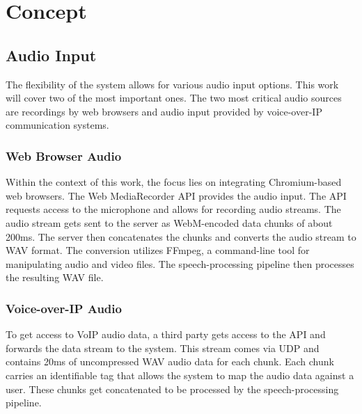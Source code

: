 \chapter{Concept}

\label{Chapter2}


\section{Audio Input}

The flexibility of the system allows for various audio input options. This work will cover two of the most important 
ones. The two most critical audio sources are recordings by web browsers and audio input provided by voice-over-IP 
communication systems.

\subsection{Web Browser Audio}

Within the context of this work, the focus lies on integrating Chromium-based web browsers. The Web MediaRecorder API 
provides the audio input. The API requests access to the microphone and allows for recording audio streams. 
The audio stream gets sent to the server as WebM-encoded data chunks of about 200ms. The server then concatenates the 
chunks and converts the audio stream to WAV format. The conversion utilizes FFmpeg, a command-line tool for 
manipulating audio and video files. The speech-processing pipeline then processes the resulting WAV file.

\subsection{Voice-over-IP Audio}

To get access to VoIP audio data, a third party gets access to the API and forwards the data stream to the system. 
This stream comes via UDP and contains 20ms of uncompressed WAV audio data for each chunk.
Each chunk carries an identifiable tag that allows the system to map the audio data against a user.
These chunks get concatenated to be processed by the speech-processing pipeline.

